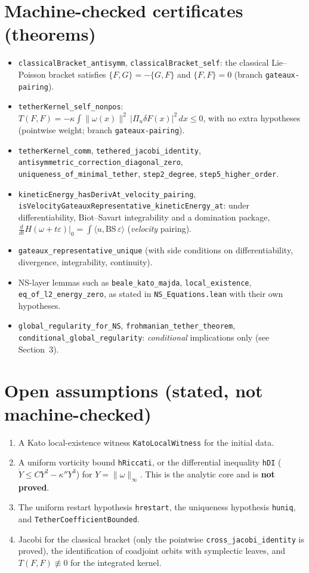 \documentclass[11pt]{article}
\begin{document}
\section{Machine-checked certificates (theorems)}
\begin{itemize}
\item \texttt{classicalBracket\_antisymm}, \texttt{classicalBracket\_self}: the classical Lie--Poisson bracket satisfies $\{F,G\}=-\{G,F\}$ and $\{F,F\}=0$ (branch \texttt{gateaux-pairing}).
\item \texttt{tetherKernel\_self\_nonpos}: $T(F,F)=-\kappa\int\|\omega(x)\|^2\,|\Pi_u\delta F(x)|^2\,dx\le 0$, with no extra hypotheses (pointwise weight; branch \texttt{gateaux-pairing}).
\item \texttt{tetherKernel\_comm}, \texttt{tethered\_jacobi\_identity}, \texttt{antisymmetric\_correction\_diagonal\_zero}, \texttt{uniqueness\_of\_minimal\_tether}, \texttt{step2\_degree}, \texttt{step5\_higher\_order}.
\item \texttt{kineticEnergy\_hasDerivAt\_velocity\_pairing}, \texttt{isVelocityGateauxRepresentative\_kineticEnergy\_at}: under differentiability, Biot--Savart integrability and a domination package, $\frac{d}{dt}H(\omega+t\varepsilon)|_{0}=\int\langle u,\mathrm{BS}\,\varepsilon\rangle$ (\emph{velocity} pairing).
\item \texttt{gateaux\_representative\_unique} (with side conditions on differentiability, divergence, integrability, continuity).
\item NS-layer lemmas such as \texttt{beale\_kato\_majda}, \texttt{local\_existence}, \texttt{eq\_of\_l2\_energy\_zero}, as stated in \texttt{NS\_Equations.lean} with their own hypotheses.
\item \texttt{global\_regularity\_for\_NS}, \texttt{frohmanian\_tether\_theorem}, \texttt{conditional\_global\_regularity}: \emph{conditional} implications only (see Section~3).
\end{itemize}

\section{Open assumptions (stated, not machine-checked)}
\begin{enumerate}
\item A Kato local-existence witness \texttt{KatoLocalWitness} for the initial data.
\item A uniform vorticity bound \texttt{hRiccati}, or the differential inequality \texttt{hDI} ($\dot Y\le CY^2-\kappa''Y^3$) for $Y=\|\omega\|_\infty$. This is the analytic core and is \textbf{not proved}.
\item The uniform restart hypothesis \texttt{hrestart}, the uniqueness hypothesis \texttt{huniq}, and \texttt{TetherCoefficientBounded}.
\item Jacobi for the classical bracket (only the pointwise \texttt{cross\_jacobi\_identity} is proved), the identification of coadjoint orbits with symplectic leaves, and $T(F,F)\not\equiv0$ for the integrated kernel.
\end{enumerate}
\end{document}
